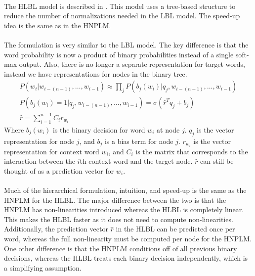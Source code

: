 \paragraph{}
The HLBL model is described in \cite{MnihHinton2009}. This model uses a tree-based structure to reduce the number of normalizations needed in the LBL model. The speed-up idea is the same as in the HNPLM.

\paragraph{}
The formulation is very similar to the LBL model. The key difference is that the word probability is now a product of binary probabilities instead of a single soft-max output. Also, there is no longer a separate representation for target words, instead we have representations for nodes in the binary tree.
\begin{align}
P(w_i | w_{i-(n-1)},\dots, w_{i-1})  \approx \prod_j P(b_j(w_i) | q_j, w_{i-(n-1)},\dots, w_{i-1}) \label{eq:HLBL}
\\ P(b_j(w_i) = 1 | q_j, w_{i-(n-1)},\dots, w_{i-1}) =  \sigma( \hat{r}^T q_{j} +b_{j})
\\ \hat{r} = \sum_{i=1}^{n-1} C_i r_{w_i}
\end{align}
Where $b_j(w_i)$ is the binary decision for word $w_i$ at node $j$. $q_j$ is the vector representation for node $j$, and $b_{j}$ is a bias term for node $j$. $r_{w_i}$ is the vector representation for context word $w_i$, and $C_i$ is the matrix that corresponds to the interaction between the $i$th context word and the target node.  $\hat{r}$ can still be thought of as a prediction vector for $w_i$. 

\paragraph{}
Much of the hierarchical formulation, intuition, and speed-up is the same as the HNPLM for the HLBL. The major difference between the two is that the HNPLM has non-linearities introduced whereas the HLBL is completely linear. This makes the HLBL faster as it does not need to compute non-linearities. Additionally, the prediction vector $\hat{r}$ in the HLBL can be predicted once per word, whereas the full non-linearity must be computed per node for the HNPLM. One other difference is that the HNPLM conditions off of all previous binary decisions, whereas the HLBL treats each binary decision independently, which is a simplifying assumption.
